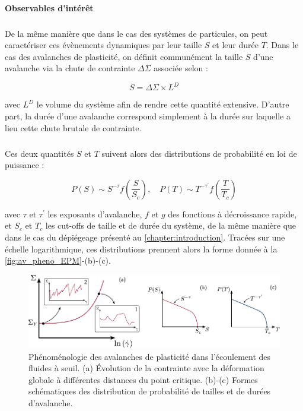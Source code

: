 \paragraph{Observables d'intérêt}

\subparagraph{}De la même manière que dans le cas des systèmes de particules, on peut caractériser ces évènements dynamiques par leur taille $S$ et leur durée $T$. Dans le cas des avalanches de plasticité, on définit communément la taille $S$ d'une avalanche via la chute de contrainte $\Delta\Sigma$ associée selon :

\begin{equation}
	S = \Delta\Sigma\times L^D
\end{equation}

\noindent avec $L^D$ le volume du système afin de rendre cette quantité extensive. D'autre part, la durée d'une avalanche correspond simplement à la durée sur laquelle a lieu cette chute brutale de contrainte.

\subparagraph{}Ces deux quantités $S$ et $T$ suivent alors des distributions de probabilité en loi de puissance :

\begin{equation}
	P(S) \sim S^{-\tau}f\left( \frac{S}{S_c} \right), \quad P(T) \sim T^{-\tau^\prime}f\left( \frac{T}{T_c} \right)
	\label{eq:AvalancheDistrib}
\end{equation}

\noindent avec $\tau$ et $\tau^\prime$ les exposants d'avalanche, $f$ et $g$ des fonctions à décroissance rapide, et $S_c$ et $T_c$ les cut-offs de taille et de durée du système, de la même manière que dans le cas du dépiégeage présenté au \autoref{chapter:introduction}. Tracées sur une échelle logarithmique, ces distributions prennent alors la forme donnée à la \autoref{fig:av_pheno_EPM}-(b)-(c).

\begin{figure}[h]
	\centering
	\includegraphics[width=\textwidth]{Chapitre4/Figures/Avalanches/Pheno.pdf}
	\caption{Phénoménologie des avalanches de plasticité dans l'écoulement des fluides à seuil. (a) Évolution de la contrainte avec la déformation globale à différentes distances du point critique. (b)-(c) Formes schématiques des distribution de probabilité de tailles et de durées d'avalanche.}
	\label{fig:av_pheno_EPM}
\end{figure}

